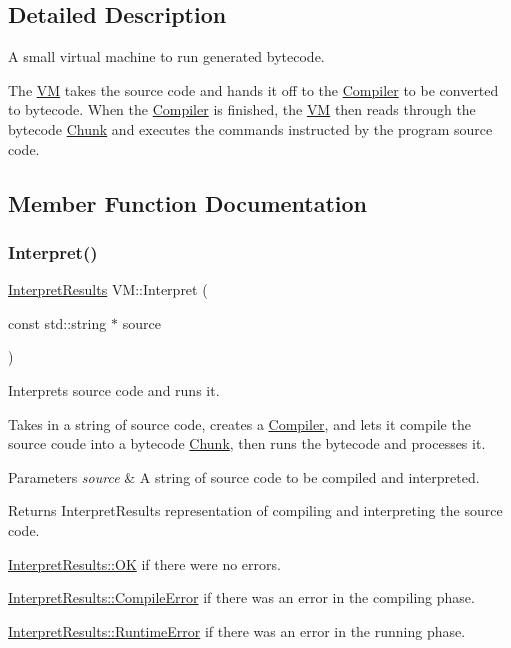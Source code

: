 \subsection{Detailed Description}
A small virtual machine to run generated bytecode. 

The \hyperlink{class_v_m}{VM} takes the source code and hands it off to the \hyperlink{class_compiler}{Compiler} to be converted to bytecode. When the \hyperlink{class_compiler}{Compiler} is finished, the \hyperlink{class_v_m}{VM} then reads through the bytecode \hyperlink{class_chunk}{Chunk} and executes the commands instructed by the program source code. 

\subsection{Member Function Documentation}
\mbox{\label{class_v_m_abc9d74981061a1ce81a0926d50bde682}} 
\subsubsection{\texorpdfstring{Interpret()}{Interpret()}}
{\footnotesize\ttfamily \hyperlink{_v_m_8h_ae6d9431ba75ad63e3dc378957e0aad8f}{Interpret\+Results} V\+M\+::\+Interpret (\begin{DoxyParamCaption}\item[{const std\+::string $\ast$}]{source }\end{DoxyParamCaption})}



Interprets source code and runs it. 

Takes in a string of source code, creates a \hyperlink{class_compiler}{Compiler}, and let\textquotesingle{}s it compile the source coude into a bytecode \hyperlink{class_chunk}{Chunk}, then runs the bytecode and processes it. 
\begin{DoxyParams}{Parameters}
{\em source} & A string of source code to be compiled and interpreted. \\
\hline
\end{DoxyParams}
\begin{DoxyReturn}{Returns}
Interpret\+Results representation of compiling and interpreting the source code.
\begin{DoxyItemize}
\item \hyperlink{_v_m_8h_ae6d9431ba75ad63e3dc378957e0aad8fae0aa021e21dddbd6d8cecec71e9cf564}{Interpret\+Results\+::\+OK} if there were no errors.
\item \hyperlink{_v_m_8h_ae6d9431ba75ad63e3dc378957e0aad8fa8512184f958cde80eef601c0c9e27f08}{Interpret\+Results\+::\+Compile\+Error} if there was an error in the compiling phase.
\item \hyperlink{_v_m_8h_ae6d9431ba75ad63e3dc378957e0aad8faa334b8fdd25f8fb3e632228494604ee1}{Interpret\+Results\+::\+Runtime\+Error} if there was an error in the running phase. 
\end{DoxyItemize}
\end{DoxyReturn}
\mbox{\label{class_v_m_aeebabdb7830a04e3cd54f33a8f8a8b14}} 
